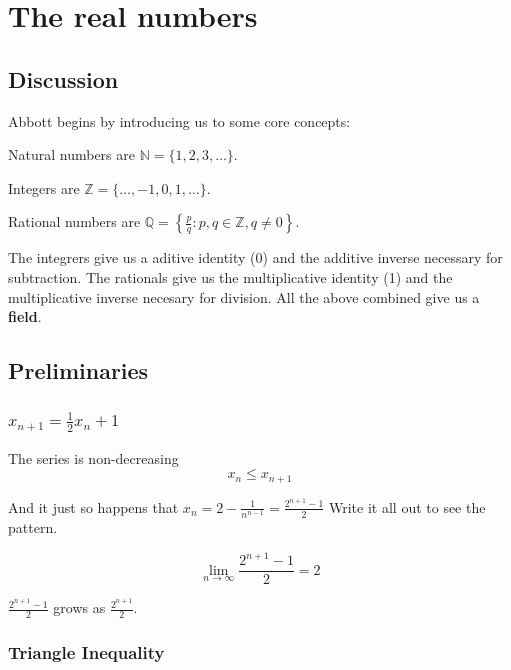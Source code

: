 \section{The real numbers}

\subsection{Discussion}

Abbott begins by introducing us to some core concepts:

Natural numbers are $\mathbb{N} = \{1, 2, 3, \ldots\}$.

Integers are $\mathbb{Z} = \{\ldots, -1, 0, 1, \ldots\}$.

Rational numbers are $\mathbb{Q} = \left\{ \frac{p}{q} : p, q \in \mathbb{Z}, q \neq 0\right\}$.

The integrers give us a aditive identity (0) and the additive inverse necessary for subtraction.
The rationals give us the multiplicative identity (1) and the multiplicative inverse necesary for division.
All the above combined give us a \textbf{field}.



\subsection{Preliminaries}

\subsubsection{$x_{n+1} = \frac{1}{2}x_n + 1$}

The series is non-decreasing
$$
x_n \leq x_{n+1}
$$

And it just so happens that $x_n = 2 - \frac{1}{ n^{n-1} } = \frac{2^{n+1} - 1}{2}$
Write it all out to see the pattern.

$$
\lim\limits_{n \to \infty} \frac{2^{n+1} - 1}{2} = 2
$$

$\frac{2^{n+1} - 1}{2}$ grows as $\frac{2^{n+1}}{2}$.





\subsubsection{Triangle Inequality}

